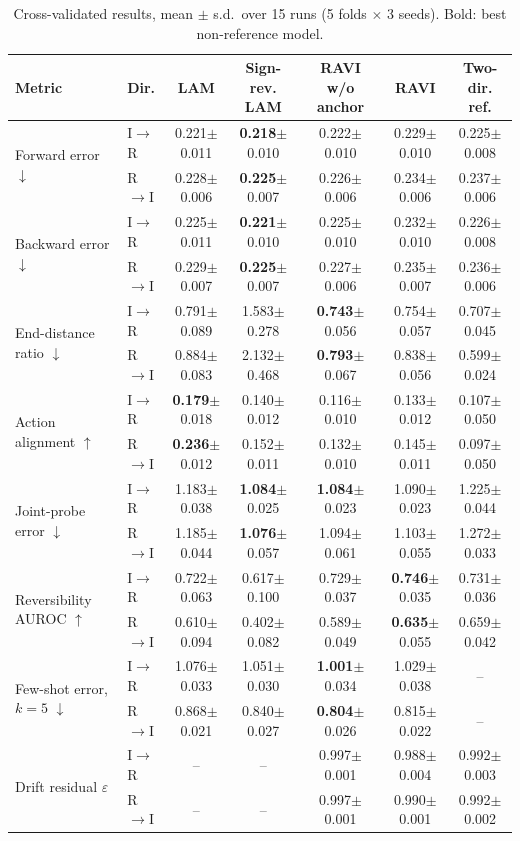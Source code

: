 \documentclass{jcse}
\newcommand{\method}{RAVI}
\begin{document}
\begin{table}
	\centering
	\caption{Cross-validated results, mean $\pm$ s.d.\ over 15 runs (5 folds $\times$ 3 seeds). Bold: best non-reference model.}
	\label{t:main}
	\footnotesize
	\setlength{\tabcolsep}{3.2pt}
	\begin{tabular}{llccccc}
		\toprule
		Metric & Dir. & LAM & Sign-rev. LAM & {\method} w/o anchor & {\method} & Two-dir. ref. \\
		\midrule
		\multirow{2}{*}{Forward error $\downarrow$} & I$\to$R & 0.221$\pm$0.011 & \textbf{0.218}$\pm$0.010 & 0.222$\pm$0.010 & 0.229$\pm$0.010 & 0.225$\pm$0.008 \\
		 & R$\to$I & 0.228$\pm$0.006 & \textbf{0.225}$\pm$0.007 & 0.226$\pm$0.006 & 0.234$\pm$0.006 & 0.237$\pm$0.006 \\
		\multirow{2}{*}{Backward error $\downarrow$} & I$\to$R & 0.225$\pm$0.011 & \textbf{0.221}$\pm$0.010 & 0.225$\pm$0.010 & 0.232$\pm$0.010 & 0.226$\pm$0.008 \\
		 & R$\to$I & 0.229$\pm$0.007 & \textbf{0.225}$\pm$0.007 & 0.227$\pm$0.006 & 0.235$\pm$0.007 & 0.236$\pm$0.006 \\
		\multirow{2}{*}{End-distance ratio $\downarrow$} & I$\to$R & 0.791$\pm$0.089 & 1.583$\pm$0.278 & \textbf{0.743}$\pm$0.056 & 0.754$\pm$0.057 & 0.707$\pm$0.045 \\
		 & R$\to$I & 0.884$\pm$0.083 & 2.132$\pm$0.468 & \textbf{0.793}$\pm$0.067 & 0.838$\pm$0.056 & 0.599$\pm$0.024 \\
		\multirow{2}{*}{Action alignment $\uparrow$} & I$\to$R & \textbf{0.179}$\pm$0.018 & 0.140$\pm$0.012 & 0.116$\pm$0.010 & 0.133$\pm$0.012 & 0.107$\pm$0.050 \\
		 & R$\to$I & \textbf{0.236}$\pm$0.012 & 0.152$\pm$0.011 & 0.132$\pm$0.010 & 0.145$\pm$0.011 & 0.097$\pm$0.050 \\
		\multirow{2}{*}{Joint-probe error $\downarrow$} & I$\to$R & 1.183$\pm$0.038 & \textbf{1.084}$\pm$0.025 & \textbf{1.084}$\pm$0.023 & 1.090$\pm$0.023 & 1.225$\pm$0.044 \\
		 & R$\to$I & 1.185$\pm$0.044 & \textbf{1.076}$\pm$0.057 & 1.094$\pm$0.061 & 1.103$\pm$0.055 & 1.272$\pm$0.033 \\
		\multirow{2}{*}{Reversibility AUROC $\uparrow$} & I$\to$R & 0.722$\pm$0.063 & 0.617$\pm$0.100 & 0.729$\pm$0.037 & \textbf{0.746}$\pm$0.035 & 0.731$\pm$0.036 \\
		 & R$\to$I & 0.610$\pm$0.094 & 0.402$\pm$0.082 & 0.589$\pm$0.049 & \textbf{0.635}$\pm$0.055 & 0.659$\pm$0.042 \\
		\multirow{2}{*}{Few-shot error, $k=5$ $\downarrow$} & I$\to$R & 1.076$\pm$0.033 & 1.051$\pm$0.030 & \textbf{1.001}$\pm$0.034 & 1.029$\pm$0.038 & -- \\
		 & R$\to$I & 0.868$\pm$0.021 & 0.840$\pm$0.027 & \textbf{0.804}$\pm$0.026 & 0.815$\pm$0.022 & -- \\
		\multirow{2}{*}{Drift residual $\varepsilon$} & I$\to$R & -- & -- & 0.997$\pm$0.001 & 0.988$\pm$0.004 & 0.992$\pm$0.003 \\
		 & R$\to$I & -- & -- & 0.997$\pm$0.001 & 0.990$\pm$0.001 & 0.992$\pm$0.002 \\
		\bottomrule
	\end{tabular}
\end{table}
\end{document}
